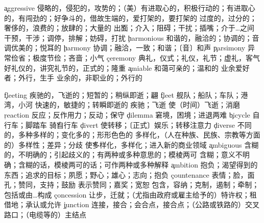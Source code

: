 \begin{multicols}{2}
\c{aggressive}  \a 侵略的，侵犯的，攻势的；（美）有进取心的，积极行动的；有进取心的，有闯劲的；好争斗的，借故生端的，爱打架的，要打架的
  \a 过度的，过分的；奢侈的，浪费的；放肆的；大量的
  \v 出面；介入；阻碍；干扰；插嘴；介于…之间
  \vi 干预，干涉；调停，排解；妨碍，打扰
\c{harmonious}  \a 和谐的，融洽的；协调的；音调优美的；悦耳的
\c{harmony}  \n 协调；融洽，一致；和谐；〔音〕和声
\c{parsimony}  \n 异常俭省；极度节俭；吝啬；小气
\c{ceremony}  \n 典礼，仪式；礼仪，礼节；虚礼，客气
  \a 好礼仪的，讲究礼节的，正式的；隆重
\c{amiable}  \a 和蔼可亲的；温和的
  \n 业余爱好者；外行，生手 \a 业余的，非职业的；外行的

\c{fleeting}  \a 疾驰的，飞逝的；短暂的；稍纵即逝；翩
\c{fleet}  \n 舰队；船队；车队；港湾，小河 \a 快速的，敏捷的；转瞬即逝的 \vi 疾驰；飞逝 \vt 使（时间）飞逝；消磨
\c{reaction}  \n 反应；反作用力；反动；保守
\c{dilemma}  \n 窘境，困境；进退两难
\c{bicycle}  \n 自行车；脚踏车 \v 骑自行车
\c{divert}  \vt 使转移；〔正式〕娱乐；转移注意力
\c{diverse}  \a 不同的，多种多样的；变化多的；形形色色的
  \n 多样化，（人在种族、民族、宗教等方面的）多样性；差异；分歧
  \v 使多样化，多样化；进入新的商业领域
\c{ambiguous}  \a 含糊的，不明确的；引起歧义的；有两种或多种意思的；模棱两可
  \n 含糊；意义不明确；含糊的话，模棱两可的话；可作两种或多种解释
\c{ambition}  \n 抱负；渴望得到的东西；追求的目标；夙愿；野心；雄心；志向；抱负
\c{countenance}  \n 表情；脸，面孔；赞同，支持；鼓励 \vt 表示赞同；嘉奖；宽恕
  \vt 包含，容纳；克制，遏制；牵制；包括或由…构成
\c{concession}  \n 让步，迁就；（尤指由政府或雇主给予的）特许权；租借地；承认或允许
\c{junction}  \n 连接，接合；会合点，接合点；（公路或铁路的）交叉路口；（电缆等的）主结点







\end{multicols}
